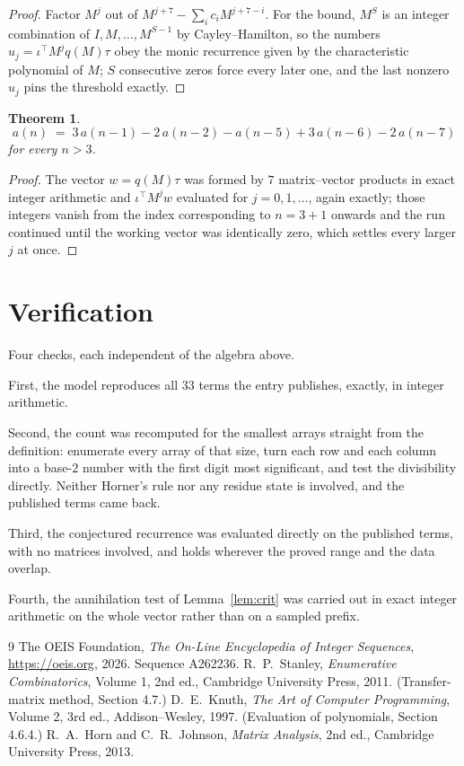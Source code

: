 \documentclass[11pt,a4paper]{article}
\theoremstyle{plain}
\newtheorem{theorem}{Theorem}
\theoremstyle{definition}
\begin{document}
\begin{proof}
Factor $M^{j}$ out of $M^{j+7}-\sum_ic_iM^{j+7-i}$. For the bound, $M^{S}$
is an integer combination of $I,M,\dots,M^{S-1}$ by Cayley--Hamilton, so the numbers
$u_j=\iota^{\!\top}M^{j}q(M)\tau$ obey the monic recurrence given by the characteristic
polynomial of $M$; $S$ consecutive zeros force every later one, and the last nonzero $u_j$
pins the threshold exactly.
\end{proof}

\begin{theorem}
\[
a(n)\;=\;3\,a(n-1) - 2\,a(n-2) - a(n-5) + 3\,a(n-6) - 2\,a(n-7)
\]
for every $n>3$.
\end{theorem}

\begin{proof}
The vector $w=q(M)\tau$ was formed by $7$ matrix--vector products in exact integer
arithmetic and $\iota^{\!\top}M^{j}w$ evaluated for $j=0,1,\dots$, again exactly; those
integers vanish from the index corresponding to $n=3+1$ onwards and the run continued
until the working vector was identically zero, which settles every larger $j$ at once.
\end{proof}

\section{Verification}

Four checks, each independent of the algebra above.

First, the model reproduces all $33$ terms the entry publishes, exactly, in integer
arithmetic.

Second, the count was recomputed for the smallest arrays straight from the definition:
enumerate every array of that size, turn each row and each column into a base-$2$ number with
the first digit most significant, and test the divisibility directly. Neither Horner's rule nor
any residue state is involved, and the published terms came back.

Third, the conjectured recurrence was evaluated directly on the published terms, with no
matrices involved, and holds wherever the proved range and the data overlap.

Fourth, the annihilation test of Lemma~\ref{lem:crit} was carried out in exact integer
arithmetic on the whole vector rather than on a sampled prefix.

\begin{thebibliography}{9}
 The OEIS Foundation, \emph{The On-Line Encyclopedia of Integer
Sequences}, \url{https://oeis.org}, 2026. Sequence A262236.
 R.~P.~Stanley, \emph{Enumerative Combinatorics}, Volume 1, 2nd ed.,
Cambridge University Press, 2011. (Transfer-matrix method, Section 4.7.)
 D.~E.~Knuth, \emph{The Art of Computer Programming}, Volume 2, 3rd ed.,
Addison--Wesley, 1997. (Evaluation of polynomials, Section 4.6.4.)
 R.~A.~Horn and C.~R.~Johnson, \emph{Matrix Analysis}, 2nd ed., Cambridge
University Press, 2013.
\end{thebibliography}
\end{document}
